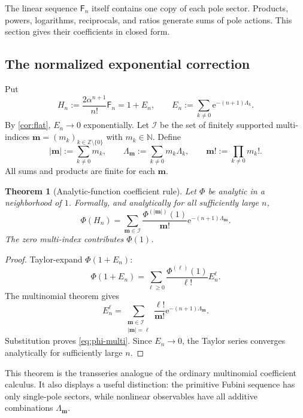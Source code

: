 \documentclass[11pt,a4paper]{article}
\newtheorem{theorem}{Theorem}[section]
\theoremstyle{definition}
\theoremstyle{remark}
\newcommand{\Fub}{\mathsf F}
\newcommand{\e}{\mathrm e}
\newcommand{\abs}[1]{\left|#1\right|}
\newcommand{\N}{\mathbb N}
\newcommand{\Z}{\mathbb Z}
\begin{document}
The linear sequence \(\Fub_n\) itself contains one copy of each pole sector.
Products, powers, logarithms, reciprocals, and ratios generate sums of pole
actions.  This section gives their coefficients in closed form.

\subsection{The normalized exponential correction}

Put
\begin{equation}\label{eq:HnEn}
 H_n:=\frac{2\alpha^{n+1}}{n!}\Fub_n
 =1+E_n,
 \qquad
 E_n:=\sum_{k\ne0}\e^{-(n+1)\Lambda_k}.
\end{equation}
By \cref{cor:flat}, \(E_n\to0\) exponentially.
Let \(\mathcal I\) be the set of finitely supported multi-indices
\(
 \bm m=(m_k)_{k\in\Z\setminus\{0\}}
\)
with \(m_k\in\N\).  Define
\begin{equation}\label{eq:multi-def}
 \abs{\bm m}:=\sum_{k\ne0}m_k,
 \qquad
 \Lambda_{\bm m}:=\sum_{k\ne0}m_k\Lambda_k,
 \qquad
 \bm m!:=\prod_{k\ne0}m_k!.
\end{equation}
All sums and products are finite for each \(\bm m\).

\begin{theorem}[Analytic-function coefficient rule]\label{thm:analytic-phi}
Let \(\Phi\) be analytic in a neighborhood of \(1\).  Formally, and
analytically for all sufficiently large \(n\),
\begin{equation}\label{eq:phi-multi}
 \Phi(H_n)
 =\sum_{\bm m\in\mathcal I}
   \frac{\Phi^{(\abs{\bm m})}(1)}{\bm m!}
   \e^{-(n+1)\Lambda_{\bm m}}.
\end{equation}
The zero multi-index contributes \(\Phi(1)\).
\end{theorem}

\begin{proof}
Taylor-expand \(\Phi(1+E_n)\):
\[
 \Phi(1+E_n)=\sum_{\ell\ge0}
 \frac{\Phi^{(\ell)}(1)}{\ell!}E_n^\ell.
\]
The multinomial theorem gives
\[
 E_n^\ell
 =\sum_{\substack{\bm m\in\mathcal I\\\abs{\bm m}=\ell}}
   \frac{\ell!}{\bm m!}
   \e^{-(n+1)\Lambda_{\bm m}}.
\]
Substitution proves \eqref{eq:phi-multi}.  Since \(E_n\to0\), the Taylor series
converges analytically for sufficiently large \(n\).
\end{proof}

This theorem is the transseries analogue of the ordinary multinomial
coefficient calculus.  It also displays a useful distinction: the primitive
Fubini sequence has only single-pole sectors, while nonlinear observables have
all additive combinations \(\Lambda_{\bm m}\).
\end{document}

